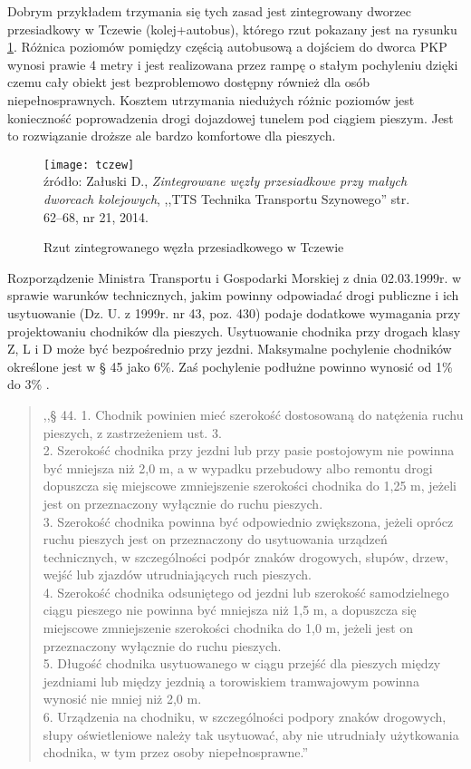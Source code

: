 \documentclass[twoside,12pt]{article}
\begin{document}
	Dobrym przykładem trzymania się tych zasad jest zintegrowany dworzec przesiadkowy w Tczewie (kolej+autobus), którego rzut pokazany jest na rysunku \ref{tczew}. Różnica poziomów pomiędzy częścią autobusową a dojściem do dworca PKP wynosi prawie 4 metry i jest realizowana przez rampę o stałym pochyleniu dzięki czemu cały obiekt jest bezproblemowo dostępny również dla osób niepełnosprawnych. Kosztem utrzymania niedużych różnic poziomów jest konieczność poprowadzenia drogi dojazdowej tunelem pod ciągiem pieszym. Jest to rozwiązanie droższe ale bardzo komfortowe dla pieszych.
	
	\begin{figure}[H]
		\centering
		\caption{Rzut zintegrowanego węzła przesiadkowego w Tczewie}
		\texttt{[image: tczew]}\\
		\footnotesize{źródło: Załuski D., \emph{Zintegrowane węzły przesiadkowe przy małych dworcach kolejowych}, ,,TTS Technika Transportu Szynowego'' str. 62--68, nr 21, 2014. \cite{zaluski}}
		\label{tczew}
	\end{figure}
	
	Rozporządzenie Ministra Transportu i Gospodarki Morskiej z dnia 02.03.1999r. w sprawie warunków technicznych, jakim powinny odpowiadać drogi publiczne i ich usytuowanie (Dz. U. z 1999r. nr 43, poz. 430)  podaje dodatkowe wymagania przy projektowaniu chodników dla pieszych. Usytuowanie chodnika przy drogach klasy Z, L i D może być bezpośrednio przy jezdni. Maksymalne pochylenie chodników określone jest w § 45 jako 6\%. Zaś pochylenie podłużne powinno wynosić od 1\% do 3\% \cite{rozporzadzenie_drogi}.
	\begin{quote}
	,,§ 44. 1. Chodnik powinien mieć szerokość dostosowaną do natężenia ruchu pieszych, z zastrzeżeniem ust. 3.\\
2. Szerokość chodnika przy jezdni lub przy pasie postojowym nie powinna być mniejsza niż 2,0 m, a w wypadku przebudowy
albo remontu drogi dopuszcza się miejscowe zmniejszenie szerokości chodnika do 1,25 m, jeżeli jest on przeznaczony
wyłącznie do ruchu pieszych.\\
3. Szerokość chodnika powinna być odpowiednio zwiększona, jeżeli oprócz ruchu pieszych jest on przeznaczony do
usytuowania urządzeń technicznych, w szczególności podpór znaków drogowych, słupów, drzew, wejść lub zjazdów utrudniających
ruch pieszych.\\
4. Szerokość chodnika odsuniętego od jezdni lub szerokość samodzielnego ciągu pieszego nie powinna być mniejsza
niż 1,5 m, a dopuszcza się miejscowe zmniejszenie szerokości chodnika do 1,0 m, jeżeli jest on przeznaczony wyłącznie do
ruchu pieszych.\\
5. Długość chodnika usytuowanego w ciągu przejść dla pieszych między jezdniami lub między jezdnią a torowiskiem
tramwajowym powinna wynosić nie mniej niż 2,0 m.\\
6. Urządzenia na chodniku, w szczególności podpory znaków drogowych, słupy oświetleniowe należy tak usytuować,
aby nie utrudniały użytkowania chodnika, w tym przez osoby niepełnosprawne.'' \cite{rozporzadzenie_drogi}
	 \end{quote}
	 
\end{document}
